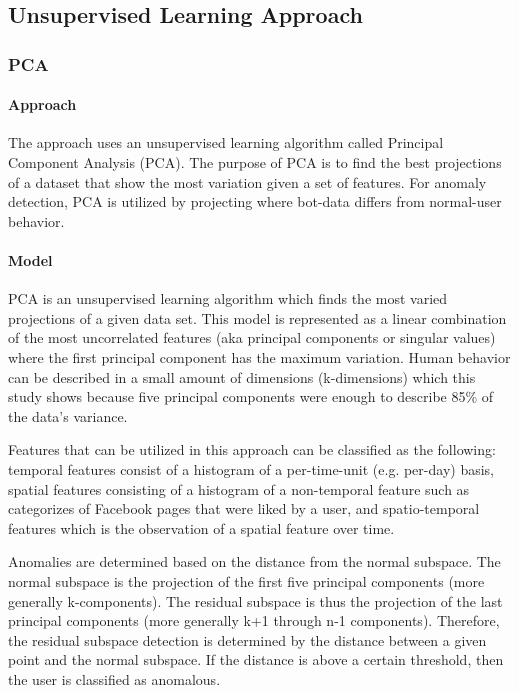 \documentclass[11pt, oneside]{article}   	%
\begin{document}
\subsection{Unsupervised Learning Approach}
\subsubsection{PCA }

\paragraph{Approach}
\quad

\quad The \cite{pca} approach uses an unsupervised learning algorithm called Principal Component Analysis (PCA).
The purpose of PCA is to find the best projections of a dataset that show the most variation given a set of features.
For anomaly detection, PCA is utilized by projecting where bot-data differs from normal-user behavior.

\paragraph{Model}
\quad

\quad PCA is an unsupervised learning algorithm which finds the most varied projections of a given data set.
This model is represented as a linear combination of the most uncorrelated features (aka principal components or singular values) where the first principal component has the maximum variation.
Human behavior can be described in a small amount of dimensions (k-dimensions) which this study shows because five principal components were enough to describe 85\% of the data's variance.

\quad Features that can be utilized in this approach can be classified as the following: temporal features consist of a histogram of a per-time-unit (e.g. per-day) basis, spatial features consisting of a histogram of a non-temporal feature such as categorizes of Facebook pages that were liked by a user, and spatio-temporal features which is the observation of a spatial feature over time.

\quad Anomalies are determined based on the distance from the normal subspace.
The normal subspace is the projection of the first five principal components (more generally k-components).
The residual subspace is thus the projection of the last principal components (more generally k+1 through n-1 components).
Therefore, the residual subspace detection is determined by the distance between a given point and the normal subspace.
If the distance is above a certain threshold, then the user is classified as anomalous.
\end{document}

